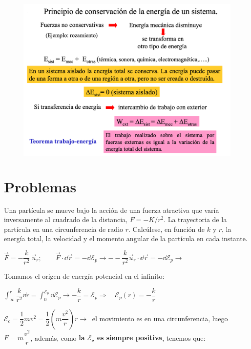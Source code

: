 \begin{figure}[H]
	\centering
	\includegraphics[width=1\textwidth]{imagenes/imagenes04/T04IM11.png}
\end{figure}


\newpage %
\section{Problemas}

\begin{prob}
Una partícula se mueve bajo la acción de una fuerza atractiva que varía inversamente al cuadrado de la distancia, $F=-K/r^2$. La trayectoria de la partícula en una circunferencia de radio $r$. Calcúlese, en función de $k$ y $r$, la energía total, la velocidad y el momento angular de la partícula en cada instante.	
\end{prob}

$\vec F=-\dfrac k {r^2}\ \vec u_r ; \qquad \vec F \cdot \dd \vec r=-\dd \mathcal E_p \to --\dfrac k {r^2} \vec u_r \cdot \dd \vec r=-\dd \mathcal E_p \to$

Tomamos el origen de energía potencial en el infinito:

$\displaystyle \int_{\infty}^r \dfrac k {r^2} \dd r = \int_0^{\mathcal E_p} \dd \mathcal E_p \to -\dfrac k r =\mathcal E_p \Rightarrow \quad \mathcal E_p(r)=-\dfrac k r$


$\mathcal E_c=\dfrac 1 2 m v^2=\dfrac 1 2  \left( m \dfrac {v^2} r \right)  r \to \ $ el movimiento es en una circunferencia, luego $F=m\dfrac {v^2}r$, además, como \textbf{la $\boldsymbol{\mathcal E_c}$ es siempre positiva}, tenemos que:

